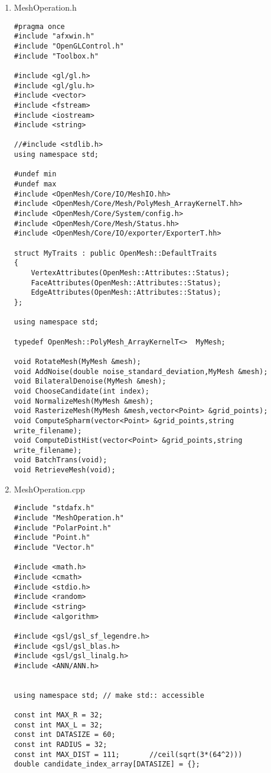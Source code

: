 \begin{enumerate}[1.]
\item MeshOperation.h

\begin{lstlisting}[xleftmargin=0em]
#pragma once
#include "afxwin.h"
#include "OpenGLControl.h"
#include "Toolbox.h"

#include <gl/gl.h>
#include <gl/glu.h>
#include <vector>
#include <fstream>
#include <iostream>
#include <string>

//#include <stdlib.h>
using namespace std;

#undef min
#undef max
#include <OpenMesh/Core/IO/MeshIO.hh>
#include <OpenMesh/Core/Mesh/PolyMesh_ArrayKernelT.hh>
#include <OpenMesh/Core/System/config.h>
#include <OpenMesh/Core/Mesh/Status.hh>
#include <OpenMesh/Core/IO/exporter/ExporterT.hh>

struct MyTraits : public OpenMesh::DefaultTraits
{
	VertexAttributes(OpenMesh::Attributes::Status);
	FaceAttributes(OpenMesh::Attributes::Status);
	EdgeAttributes(OpenMesh::Attributes::Status);
};

using namespace std;

typedef OpenMesh::PolyMesh_ArrayKernelT<>  MyMesh;

void RotateMesh(MyMesh &mesh);
void AddNoise(double noise_standard_deviation,MyMesh &mesh);
void BilateralDenoise(MyMesh &mesh);
void ChooseCandidate(int index);
void NormalizeMesh(MyMesh &mesh);
void RasterizeMesh(MyMesh &mesh,vector<Point> &grid_points);
void ComputeSpharm(vector<Point> &grid_points,string write_filename);
void ComputeDistHist(vector<Point> &grid_points,string write_filename);
void BatchTrans(void);
void RetrieveMesh(void);
\end{lstlisting}

\item MeshOperation.cpp

\begin{lstlisting}[xleftmargin=0em]
#include "stdafx.h"
#include "MeshOperation.h"
#include "PolarPoint.h"
#include "Point.h"
#include "Vector.h"

#include <math.h>
#include <cmath>
#include <stdio.h>
#include <random>
#include <string>
#include <algorithm>

#include <gsl/gsl_sf_legendre.h>
#include <gsl/gsl_blas.h>
#include <gsl/gsl_linalg.h>
#include <ANN/ANN.h>


using namespace std; // make std:: accessible

const int MAX_R = 32;
const int MAX_L = 32;
const int DATASIZE = 60;
const int RADIUS = 32;
const int MAX_DIST = 111;		//ceil(sqrt(3*(64^2)))
double candidate_index_array[DATASIZE] = {}; 


\end{lstlisting}
\end{enumerate}
